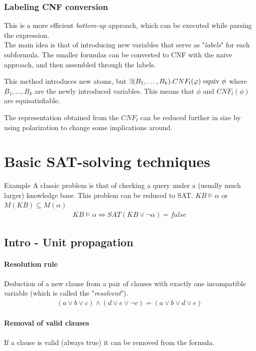 \documentclass{article}
\begin{document}
\subsubsection{Labeling CNF conversion}
This is a more efficient \textit{bottom-up} approach, which can be executed while parsing the expression.\\
The main idea is that of introducing new variables that serve as "\textit{labels}" for each subformula. The smaller formulas can be converted to CNF with the naive approach, and then assembled through the labels.

This method introduces new atoms, but $\exists(B_1,\dots,B_k).CNF_l(\varphi)\ \te{equiv}\ \phi$ where $B_1,\dots,B_k$ are the newly introduced variables. This means that $\phi$ and $CNF_l(\phi)$ are equisatisfiable.

The representation obtained from the $CNF_l$ can be reduced  further in size by using polarization to change some implications around.

\section{Basic SAT-solving techniques}
\begin{esempio}{Example}
    A classic problem is that of checking a query under a (usually much larger) knowledge base. This problem can be reduced to SAT. $KB\models\alpha$ or $M(KB)\subseteq M(\alpha)$
    \begin{align*}
        KB\models \alpha \iff SAT(KB \vee \neg \alpha) = false
    \end{align*}
\end{esempio}

\subsection{Intro - Unit propagation}
\paragraph{Resolution rule} Deduction of a new clause from a pair of clauses with exactly one incompatible variable (which is called the "\textit{resolvent}").
\begin{align*}
    (a\vee b\vee c) \wedge (d\vee e\vee \neg c) = (a\vee b\vee d\vee e)
\end{align*}

\paragraph{Removal of valid clauses}
If a clause is valid (always true) it can be removed from the formula.
\end{document}
